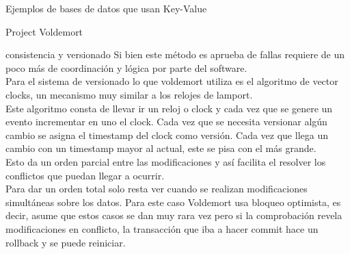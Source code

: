 \begin{section}{Ejemplos de bases de datos que usan Key-Value}
\begin{subsection}{Project Voldemort}
\begin{subsubsection}{consistencia y versionado}
Si bien este método es aprueba de fallas requiere de un poco más de coordinación y lógica por parte del software.\\

Para el sistema de versionado lo que voldemort utiliza es el algoritmo de vector clocks, un mecanismo muy similar a los relojes de lamport. \\

Este algoritmo consta de llevar ir un reloj o clock y cada vez que se genere un evento incrementar en uno el clock. Cada vez que se necesita versionar algún cambio se asigna el timestamp del clock como versión. Cada vez que llega un cambio con un timestamp mayor al actual, este se pisa con el más grande. \\

Esto da un orden parcial entre las modificaciones y así facilita el resolver los conflictos que puedan llegar a ocurrir.\\

Para dar un orden total solo resta ver cuando se realizan modificaciones simultáneas sobre los datos. Para este caso Voldemort usa bloqueo optimista, es decir, asume que estos casos se dan muy rara vez pero si la comprobación revela modificaciones en conflicto, la transacción que iba a hacer commit hace un rollback y se puede reiniciar.\\

\end{subsubsection}

\end{subsection}

\end{section}

